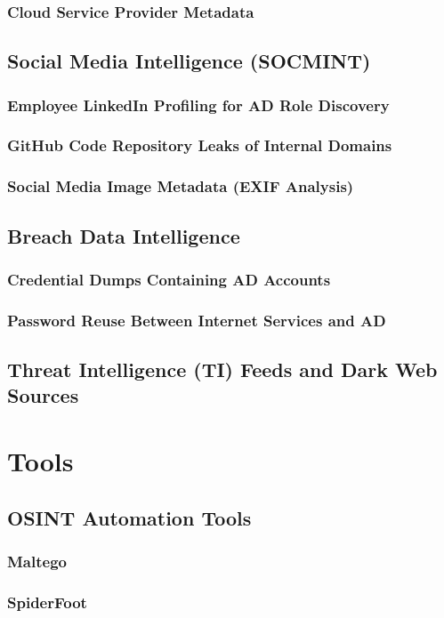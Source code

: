 \documentclass{article}
\begin{document}
\subsubsection{Cloud Service Provider Metadata}
\subsection{Social Media Intelligence (SOCMINT)}
\subsubsection{Employee LinkedIn Profiling for AD Role Discovery}
\subsubsection{GitHub Code Repository Leaks of Internal Domains}
\subsubsection{Social Media Image Metadata (EXIF Analysis)}
\subsection{Breach Data Intelligence}
\subsubsection{Credential Dumps Containing AD Accounts}
\subsubsection{Password Reuse Between Internet Services and AD}
\subsection{Threat Intelligence (TI) Feeds and Dark Web Sources}
\section{Tools}
\subsection{OSINT Automation Tools}
\subsubsection{Maltego}
\subsubsection{SpiderFoot}
\end{document}
